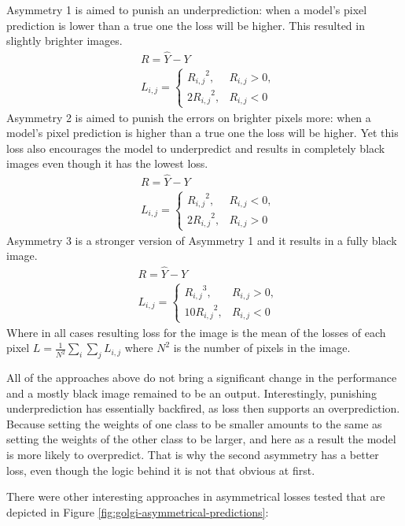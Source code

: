 Asymmetry 1 is aimed to punish an underprediction: when a model's pixel prediction is lower than a true one the loss will be higher. This resulted in slightly brighter images.
\begin{align*}
	&R = \hat{Y} - Y \\
	&L_{i, j} = \begin{cases}
			{R_{i, j}}^2, & R_{i, j} > 0, \\
		2{R_{i, j}}^2, & R_{i, j} < 0
	\end{cases}
\end{align*}
Asymmetry 2 is aimed to punish the errors on brighter pixels more: when a model's pixel prediction is higher than a true one the loss will be higher. Yet this loss also encourages the model to underpredict and results in completely black images even though it has the lowest loss.
\begin{align*}
	&R = \hat{Y} - Y \\
	&L_{i, j} = \begin{cases}
			{R_{i, j}}^2, & R_{i, j} < 0, \\
			2{R_{i, j}}^2, & R_{i, j} > 0
	\end{cases}
\end{align*}
Asymmetry 3 is a stronger version of Asymmetry 1 and it results in a fully black image.
\begin{align*}
	&R = \hat{Y} - Y \\
	&L_{i, j} = \begin{cases}
			{R_{i, j}}^3, & R_{i, j} > 0, \\
		10{R_{i, j}}^2, & R_{i, j} < 0
	\end{cases}
\end{align*}
Where in all cases resulting loss for the image is the mean of the losses of each pixel $L = \frac{1}{N^2}\sum\limits_i\sum\limits_j L_{i, j}$ where $N^2$ is the number of pixels in the image.

All of the approaches above do not bring a significant change in the performance and a mostly black image remained to be an output. Interestingly, punishing underprediction has essentially backfired, as loss then supports an overprediction. Because setting the weights of one class to be smaller amounts to the same as setting the weights of the other class to be larger, and here as a result the model is more likely to overpredict. That is why the second asymmetry has a better loss, even though the logic behind it is not that obvious at first. 

There were other interesting approaches in asymmetrical losses tested that are depicted in Figure \ref{fig:golgi-asymmetrical-predictions}:

